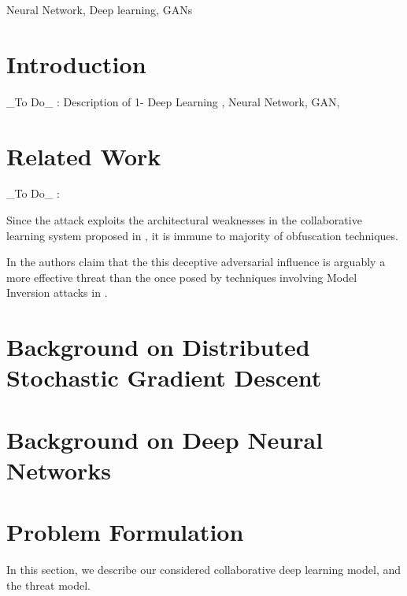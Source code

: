 \documentclass[conference]{IEEEtran}
\begin{document}
\begin{IEEEkeywords}
Neural Network, Deep learning, GANs
\end{IEEEkeywords}

\section{Introduction}
\_To Do\_ : Description of 1- Deep Learning , Neural Network, GAN,

\section{Related Work}
\_To Do\_ :

Since the attack \cite{hitaj2017deep} exploits the architectural weaknesses in the collaborative learning system proposed in \cite{abadi2016deep}, 
it is
immune to majority of obfuscation techniques. 

In \cite{hitaj2017deep} the authors claim that the this deceptive adversarial influence is arguably a more
effective threat than the once posed by techniques involving Model Inversion attacks in \cite{deng2012mnist}.

\section{Background on Distributed Stochastic Gradient Descent}


\section{Background on Deep Neural Networks}



\section{Problem Formulation}
In this section, we describe our considered collaborative deep learning model, and the threat model. 
\end{document}
